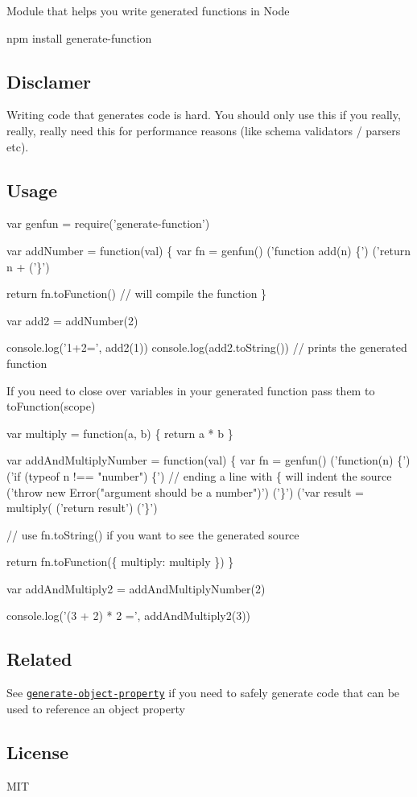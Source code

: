 Module that helps you write generated functions in Node


\begin{DoxyCode}
npm install generate-function
\end{DoxyCode}


\href{http://travis-ci.org/mafintosh/generate-function}{\tt }

\subsection*{Disclamer}

Writing code that generates code is hard. You should only use this if you really, really, really need this for performance reasons (like schema validators / parsers etc).

\subsection*{Usage}


\begin{DoxyCode}
var genfun = require('generate-function')

var addNumber = function(val) \{
  var fn = genfun()
    ('function add(n) \{')
      ('return n + %
    ('\}')

  return fn.toFunction() // will compile the function
\}

var add2 = addNumber(2)

console.log('1+2=', add2(1))
console.log(add2.toString()) // prints the generated function
\end{DoxyCode}


If you need to close over variables in your generated function pass them to {\ttfamily to\+Function(scope)}


\begin{DoxyCode}
var multiply = function(a, b) \{
  return a * b
\}

var addAndMultiplyNumber = function(val) \{
  var fn = genfun()
    ('function(n) \{')
      ('if (typeof n !== "number") \{') // ending a line with \{ will indent the source
        ('throw new Error("argument should be a number")')
      ('\}')
      ('var result = multiply(%
      ('return result')
    ('\}')

  // use fn.toString() if you want to see the generated source

  return fn.toFunction(\{
    multiply: multiply
  \})
\}

var addAndMultiply2 = addAndMultiplyNumber(2)

console.log('(3 + 2) * 2 =', addAndMultiply2(3))
\end{DoxyCode}


\subsection*{Related}

See \href{https://github.com/mafintosh/generate-object-property}{\tt generate-\/object-\/property} if you need to safely generate code that can be used to reference an object property

\subsection*{License}

M\+IT 